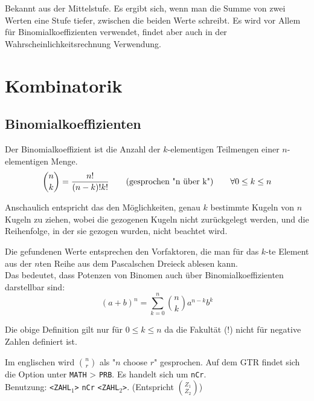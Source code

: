 \documentclass[../MAIN/main.tex]{subfiles}
\begin{document}
Bekannt aus der Mittelstufe. Es ergibt sich, wenn man die Summe von zwei Werten eine Stufe tiefer, zwischen die beiden Werte schreibt. Es wird vor Allem für Binomialkoeffizienten verwendet, findet aber auch in der Wahrscheinlichkeitsrechnung Verwendung.


\section{Kombinatorik}
\subsection{Binomialkoeffizienten}
\begin{Definition}
  Der Binomialkoeffizient ist die Anzahl der $k$-elementigen Teilmengen einer $n$-elementigen Menge.
  $$ {n\choose k} = \dfrac{n!}{(n-k)!k!} \text{\qquad (gesprochen "n über k")}\qquad \forall 0 \leq k \leq n$$
\end{Definition}
\begin{Bemerkung}
  Anschaulich entspricht das den Möglichkeiten, genau $k$ bestimmte Kugeln von $n$ Kugeln zu ziehen, wobei die gezogenen Kugeln nicht zurückgelegt werden, und die Reihenfolge, in der sie gezogen wurden, nicht beachtet wird.
\end{Bemerkung}
\begin{Bemerkung}
  Die gefundenen Werte entsprechen den Vorfaktoren, die man für das $k$-te Element aus der $n$ten Reihe aus dem Pascalschen Dreieck ablesen kann.\\
  Das bedeutet, dass Potenzen von Binomen auch über Binomialkoeffizienten darstellbar sind:
  $$(a+b)^n = \sum_{k=0}^n {n\choose k} a^{n-k}b^{k}$$
\end{Bemerkung}

\begin{Bemerkung}
  Die obige Definition gilt nur für $0 \leq k \leq n$ da die Fakultät ($!$) nicht für negative Zahlen definiert ist.
\end{Bemerkung}

\begin{GTR-Tipp}
  Im englischen wird ${n \choose r}$ als "$n$ choose $r$" gesprochen. Auf dem GTR findet sich die Option unter \texttt{MATH} > \texttt{PRB}. Es handelt sich um \texttt{nCr}.\\
  Benutzung: \texttt{<ZAHL$_1$>} \texttt{nCr} \texttt{<ZAHL$_2$>}. (Entspricht ${Z_1 \choose Z_2}$)
\end{GTR-Tipp}
\end{document}
